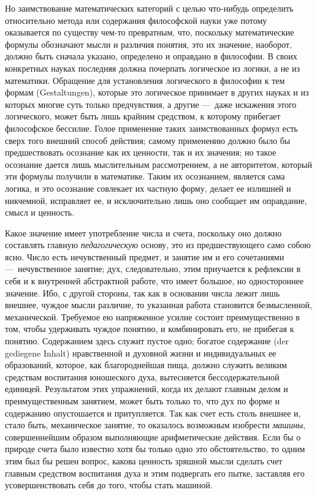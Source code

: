 Но заимствование математических категорий с целью что-нибудь определить
относительно метода или содержания философской науки уже потому оказывается
по существу чем-то превратным, что, поскольку математические формулы
обозначают мысли и различия понятия, это их значение, наоборот, должно быть
сначала указано, определено и оправдано в философии. В своих конкретных
науках последняя должна почерпать логическое из логики, а не из математики.
Обращение для установления логического в философии к тем формам
(Gestaltungen), которые это логическое принимает в других науках и из
которых многие суть только предчувствия, а другие —~даже искажения этого
логического, может быть лишь крайним средством, к которому прибегает
философское бессилие. Голое применение таких заимствованных формул есть
сверх того внешний способ действия; самому применению должно было бы
предшествовать осознание как их ценности, так и их значения; но такое
осознание дается лишь мыслительным рассмотрением, а не авторитетом, который
эти формулы получили в математике. Таким их осознанием, является сама
логика, и это осознание совлекает их частную форму, делает ее излишней и
никчемной, исправляет ее, и исключительно лишь оно сообщает им оправдание,
смысл и ценность.

Какое значение имеет употребление числа и счета, поскольку оно должно
составлять главную {\em педагогическую} основу, это из
предшествующего само собою ясно. Число есть нечувственный предмет, и
занятие им и его сочетаниями —~нечувственное занятие; дух, следовательно,
этим приучается к рефлексии в себя и к внутренней абстрактной работе, что
имеет большое, но одностороннее значение. Ибо, с другой стороны, так как в
основании числа лежит лишь внешнее, чуждое мысли различие, то указанная
работа становится безмысленной, механической. Требуемое ею напряженное
усилие состоит преимущественно в том, чтобы удерживать чуждое понятию, и
комбинировать его, не прибегая к понятию. Содержанием здесь служит пустое
одно; богатое содержание (der gediegene Inhalt) нравственной и духовной
жизни и индивидуальных ее образований, которое, как благороднейшая пища,
должно служить великим средствам воспитания юношеского духа, вытесняется
бессодержательной единицей. Результатом этих упражнений, когда их делают
главным делом и преимущественным занятием, может быть только то, что дух по
форме и содержанию опустошается и притупляется. Так как счет есть столь
внешнее и, стало быть, механическое занятие, то оказалось возможным
изобрести {\em машины}, совершеннейшим образом
выполняющие арифметические действия. Если бы о природе счета было известно
хотя бы только одно это обстоятельство, то одним этим был бы решен вопрос,
какова ценность зряшной мысли сделать счет главным средством воспитания
духа и этим подвергать его пытке, заставляя его усовершенствовать себя до
того, чтобы стать машиной.

